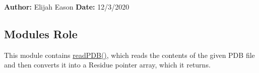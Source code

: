 {\bfseries Author\+:} Elijah Eason {\bfseries Date\+:} 12/3/2020 \subsection*{Module\textquotesingle{}s Role}

This module contains \hyperlink{io_8c_a0e8de96ba9834b755921d68a54169018}{read\+P\+D\+B()}, which reads the contents of the given P\+DB file and then converts it into a Residue pointer array, which it returns. 